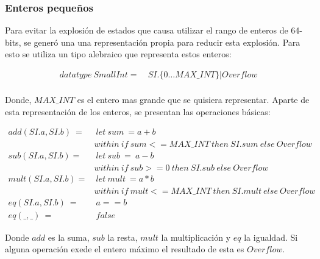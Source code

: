 \subsubsection{Enteros pequeños}

Para evitar la explosión de estados que causa utilizar el rango de enteros de 64-bits, se generó una una representación propia para reducir esta explosión. Para esto se utiliza un tipo alebraico que representa estos enteros:

\begin{align*}
datatype\ SmallInt =&\ SI.\{0 \ldots MAX\_INT\} | Overflow \\
\end{align*}

Donde, $MAX\_INT$ es el entero mas grande que se quisiera representar. Aparte de esta representación de los enteros, se presentan las operaciones básicas:

\begin{align*}
add(SI.a, SI.b)\ =&\ let\ sum\ = a + b \\
&within\ if\ sum <= MAX\_INT\ then\ SI.sum\ else\ Overflow  \\
%
sub(SI.a, SI.b) =&\ let\ sub\ =\ a - b \\
& within\ if\ sub >= 0\ then\ SI.sub\ else\ Overflow \\
%
mult(SI.a, SI.b) =&\ let\ mult\ = a * b \\
& within\ if\ mult <= MAX\_INT\ then\ SI.mult\ else\ Overflow \\
eq(SI.a, SI.b)\ =&\ a == b \\
eq(\_, \_)\ =&\ false
\end{align*}

Donde $add$ es la suma, $sub$ la resta, $mult$ la multiplicación y $eq$ la igualdad. Si alguna operación exede el entero máximo el resultado de esta es $Overflow$.

